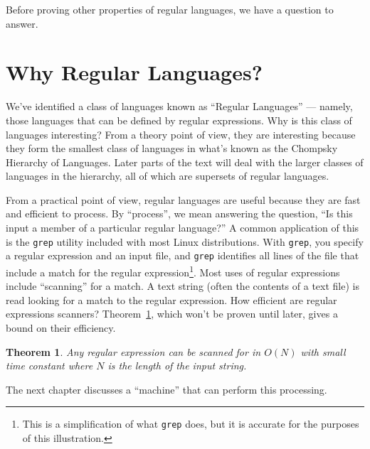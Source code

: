 \documentclass[letterpaper,12pt,openany,reqno]{book}%
\newcommand{\code}[1] {\lstinline[breaklines=yes,breakatwhitespace=yes]{#1}}
\newtheorem{theorem}{Theorem}
\begin{document}
Before proving other properties of regular languages, we have a question to answer.

\section{Why Regular Languages?}
We've identified a class of languages known as ``Regular Languages'' --- namely, those languages that can be defined by regular expressions. Why is this class of languages interesting? From a theory point of view, they are interesting because they form the smallest class of languages in what's known as the Chompsky Hierarchy of Languages. Later parts of the text will deal with the larger classes of languages in the hierarchy, all of which are supersets of regular languages. 

From a practical point of view, regular languages are useful because they are fast and efficient to process. By ``process'', we mean answering the question, ``Is this input a member of a particular regular language?'' A common application of this is the \code{grep} utility included with most Linux distributions. With \code{grep}, you specify a regular expression and an input file, and \code{grep} identifies all lines of the file that include a match for the regular expression\footnote{This is a simplification of what \code{grep} does, but it is accurate for the purposes of this illustration.}. Most uses of regular expressions include ``scanning'' for a match. A text string (often the contents of a text file) is read looking for a match to the regular expression. How efficient are regular expressions scanners? Theorem~\ref{TH.O.N.for.res}, which won't be proven until later, gives a bound on their efficiency.
\begin{theorem}
\label{TH.O.N.for.res}
Any regular expression can be scanned for in $O(N)$ with small time constant where $N$ is the length of the input string.
\end{theorem}

The next chapter discusses a ``machine'' that can perform this processing.
\end{document}
